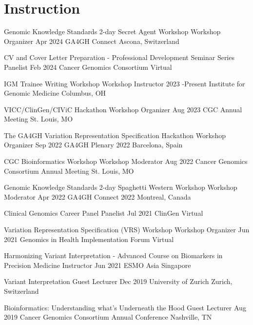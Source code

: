 \documentclass[10pt]{article} %
\begin{document}

\section{Instruction}

\instruction
{Genomic Knowledge Standards 2-day Secret Agent Workshop}
{Workshop Organizer}
{Apr 2024}{}
{GA4GH Connect}
{Ascona, Switzerland}

\instruction
{CV and Cover Letter Preparation - Professional Development Seminar Series}
{Panelist}
{Feb 2024}{}
{Cancer Genomics Consortium}
{Virtual}

\instruction
{IGM Trainee Writing Workshop}
{Workshop Instructor}
{2023 -}{Present}
{Institute for Genomic Medicine}
{Columbus, OH}

\instruction
{VICC/ClinGen/CIViC Hackathon}
{Workshop Organizer}
{Aug 2023}{}
{CGC Annual Meeting}
{St. Louis, MO}

\instruction
{The GA4GH Variation Representation Specification Hackathon}
{Workshop Organizer}
{Sep 2022}{}
{GA4GH Plenary 2022}
{Barcelona, Spain}

\instruction
{CGC Bioinformatics Workshop}
{Workshop Moderator}
{Aug 2022}{}
{Cancer Genomics Consortium Annual Meeting}
{St. Louis, MO}

\instruction
{Genomic Knowledge Standards 2-day Spaghetti Western Workshop}
{Workshop Moderator}
{Apr 2022}{}
{GA4GH Connect 2022}
{Montreal, Canada}

\instruction
{Clinical Genomics Career Panel}
{Panelist}
{Jul 2021}{}
{ClinGen}
{Virtual}

\instruction
{Variation Representation Specification (VRS) Workshop}
{Workshop Organizer}
{Jun 2021}{}
{Genomics in Health Implementation Forum}
{Virtual}

\instruction
{Harmonizing Variant Interpretation - Advanced Course on Biomarkers in Precision Medicine}
{Instructor}
{Jun 2021}{}
{ESMO Asia}
{Singapore}

\instruction
{Variant Interpretation}
{Guest Lecturer}
{Dec 2019}{}
{University of Zurich}
{Zurich, Switzerland}

\instruction
{Bioinformatics: Understanding what's Underneath the Hood}
{Guest Lecturer}
{Aug 2019}{}
{Cancer Genomics Consortium Annual Conference}
{Nashville, TN}
\end{document}
